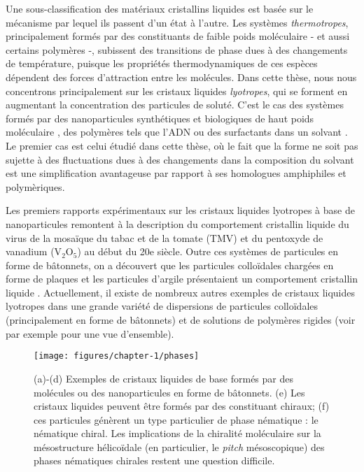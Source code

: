 Une sous-classification des matériaux cristallins liquides est basée sur le mécanisme par lequel ils passent d'un état à l'autre. Les systèmes {\em thermotropes}, principalement formés par des constituants de faible poids moléculaire - et aussi certains polymères -, subissent des transitions de phase dues à des changements de température, puisque les propriétés thermodynamiques de ces espèces dépendent des forces d'attraction entre les molécules. Dans cette thèse, nous nous concentrons principalement sur les cristaux liquides {\em lyotropes}, qui se forment en augmentant la concentration des particules de soluté. C'est le cas des systèmes formés par des nanoparticules synthétiques et biologiques de haut poids moléculaire \cite{sonin1998inorganic,dogic-fraden_fil}, des polymères tels que l'ADN \cite{livolantDNAoverview} ou des surfactants dans un solvant \cite{fontell1981}. Le premier cas est celui étudié dans cette thèse, où le fait que la forme ne soit pas sujette à des fluctuations dues à des changements dans la composition du solvant est une simplification avantageuse par rapport à ses homologues amphiphiles et polymèriques.

Les premiers rapports expérimentaux sur les cristaux liquides lyotropes à base de nanoparticules remontent à la description du comportement cristallin liquide du virus de la mosaïque du tabac et de la tomate (TMV) \cite{Bawden,Bernal} et du pentoxyde de vanadium (V$_{2}$O$_{5}$) \cite{Zocher} au début du 20e siècle. Outre ces systèmes de particules en forme de bâtonnets, on a découvert que les particules colloïdales chargées en forme de plaques et les particules d'argile présentaient un comportement cristallin liquide \cite{Langmuir}. Actuellement, il existe de nombreux autres exemples de cristaux liquides lyotropes dans une grande variété de dispersions de particules colloïdales (principalement en forme de bâtonnets) et de solutions de polymères rigides (voir par exemple \cite{Dierking2020} pour une vue d'ensemble).

\begin{figure}
\texttt{[image: figures/chapter-1/phases]}
\caption[Exemples de cristaux liquides basiques formés par des molécules ou des nanoparticules en forme de bâtonnets]{ \label{frenchfig} (a)-(d) Exemples de cristaux liquides de base formés par des molécules ou des nanoparticules en forme de bâtonnets. (e) Les cristaux liquides peuvent être formés par des constituant chiraux; (f) ces particules génèrent un type particulier de phase nématique : le nématique chiral. Les implications de la chiralité moléculaire sur la mésostructure hélicoïdale (en particulier, le {\em pitch} mésoscopique) des phases nématiques chirales restent une question difficile.}
\end{figure}

